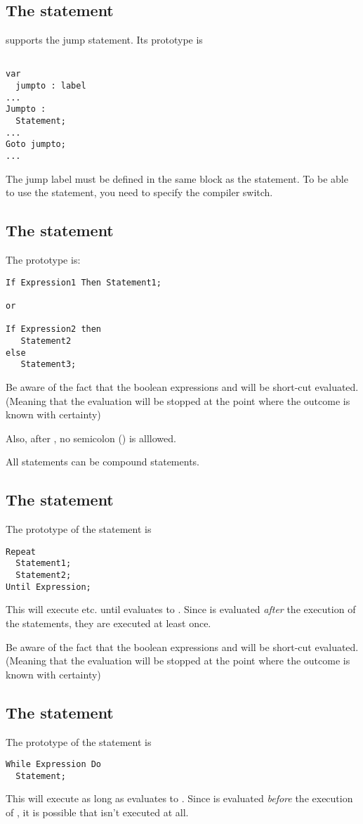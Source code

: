 \documentclass{report}
\begin{document}
\subsection{The  statement}
\fpk supports the  jump statement. Its prototype is
\begin{verbatim}

var
  jumpto : label
...
Jumpto : 
  Statement;
...
Goto jumpto;
...
\end{verbatim}
The jump label must be defined in the same block as the 
statement.
To be able to use the  statement, you need to specify the 
compiler switch.
\subsection{The  statement}
The  prototype is:
\begin{verbatim}
If Expression1 Then Statement1;

or 

If Expression2 then 
   Statement2
else
   Statement3;
\end{verbatim}
Be aware of the fact that the boolean expressions  and
 will be short-cut evaluated. (Meaning that the evaluation
will be stopped at the point where the outcome is known with certainty)

Also, after , no semicolon (\var{;}) is alllowed.

All statements can be compound statements.
\subsection{The  statement}
The prototype of the  statement is
\begin{verbatim}
Repeat
  Statement1;
  Statement2;
Until Expression;
\end{verbatim}
This will execute  etc. until  evaluates to
. Since  is evaluated {\em after} the execution of the
statements, they are executed at least once.

Be aware of the fact that the boolean expressions  and
 will be short-cut evaluated. (Meaning that the evaluation
will be stopped at the point where the outcome is known with certainty)

\subsection{The  statement}
The prototype of the  statement is
\begin{verbatim}
While Expression Do
  Statement;
\end{verbatim}
This will execute  as long as  evaluates to
. Since  is evaluated {\em before} the execution
of , it is possible that  isn't executed at
all.
\end{document}
